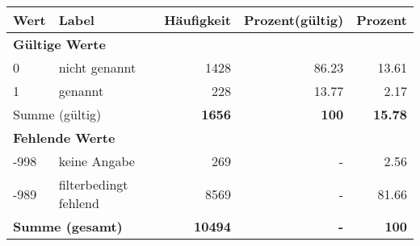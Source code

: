      \begin{longtable}{lXrrr}
     \toprule
     \textbf{Wert} & \textbf{Label} & \textbf{Häufigkeit} & \textbf{Prozent(gültig)} & \textbf{Prozent} \\
     \endhead
     \midrule
     \multicolumn{5}{l}{\textbf{Gültige Werte}}\\

     0 &
     \multicolumn{1}{X}{ nicht genannt   } &


       \num{1428} &
       \num[round-mode=places,round-precision=2]{86,23} &
         \num[round-mode=places,round-precision=2]{13,61} \\

     1 &
     \multicolumn{1}{X}{ genannt   } &


       \num{228} &
       \num[round-mode=places,round-precision=2]{13,77} &
         \num[round-mode=places,round-precision=2]{2,17} \\
     \midrule
     \multicolumn{2}{l}{Summe (gültig)} &
       \textbf{\num{1656}} &
     \textbf{100} &
       \textbf{\num[round-mode=places,round-precision=2]{15,78}} \\
     \multicolumn{5}{l}{\textbf{Fehlende Werte}}\\
       -998 &
       keine Angabe &
         \num{269} &
        - &
         \num[round-mode=places,round-precision=2]{2,56} \\
       -989 &
       filterbedingt fehlend &
         \num{8569} &
        - &
         \num[round-mode=places,round-precision=2]{81,66} \\
     \midrule
     \multicolumn{2}{l}{\textbf{Summe (gesamt)}} &
          \textbf{\num{10494}} &
        \textbf{-} &
        \textbf{100} \\
     \bottomrule
     \end{longtable}
     

